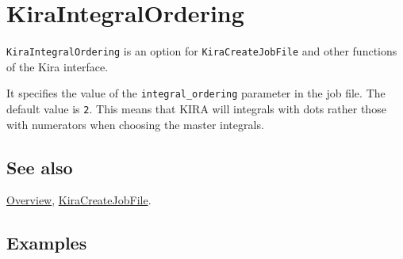 \documentclass[../FeynHelpersManual.tex]{subfiles}
\begin{document}
\hypertarget{kiraintegralordering}{
\section{KiraIntegralOrdering}\label{kiraintegralordering}}

\texttt{KiraIntegralOrdering} is an option for
\texttt{KiraCreateJobFile} and other functions of the Kira interface.

It specifies the value of the \texttt{integral_ordering} parameter in
the job file. The default value is \texttt{2}. This means that KIRA will
integrals with dots rather those with numerators when choosing the
master integrals.

\subsection{See also}

\hyperlink{toc}{Overview},
\hyperlink{kiracreatejobfile}{KiraCreateJobFile}.

\subsection{Examples}
\end{document}
